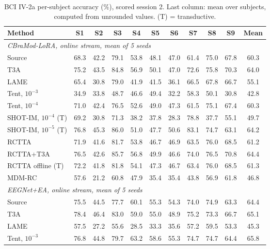 \documentclass[preprint,12pt]{elsarticle}
\begin{document}
\begin{table}[!htbp]
\centering
\caption{BCI IV-2a per-subject accuracy (\%), scored session 2. Last column: mean over subjects, computed from unrounded values. (T) = transductive.}
\label{tab:persub}
\setlength{\tabcolsep}{5pt}
\begin{adjustbox}{max width=\textwidth}
\begin{tabular}{@{}l ccccccccc c@{}}
\toprule
Method & S1 & S2 & S3 & S4 & S5 & S6 & S7 & S8 & S9 & Mean \\
\midrule
\multicolumn{11}{l}{\textit{CBraMod-LoRA, online stream, mean of 5 seeds}}\\
Source & 68.3 & 42.2 & 79.1 & 53.8 & 48.1 & 47.0 & 61.4 & 75.0 & 67.8 & 60.3 \\
T3A & 75.2 & 43.5 & 84.8 & 56.9 & 50.1 & 47.0 & 72.6 & 75.8 & 70.3 & 64.0 \\
LAME & 65.4 & 30.8 & 79.0 & 41.9 & 41.5 & 36.1 & 66.5 & 67.8 & 66.7 & 55.1 \\
Tent, $10^{-3}$ & 34.9 & 33.8 & 48.7 & 46.6 & 49.4 & 32.2 & 58.3 & 50.1 & 30.8 & 42.8 \\
Tent, $10^{-4}$ & 71.0 & 42.4 & 76.5 & 52.6 & 49.0 & 47.3 & 61.5 & 75.1 & 67.4 & 60.3 \\
SHOT-IM, $10^{-4}$ (T) & 69.2 & 30.8 & 71.3 & 38.2 & 37.8 & 28.3 & 78.8 & 37.7 & 55.1 & 49.7 \\
SHOT-IM, $10^{-5}$ (T) & 76.8 & 45.3 & 86.0 & 51.0 & 47.7 & 50.6 & 83.1 & 74.7 & 63.1 & 64.2 \\
RCTTA & 71.9 & 41.6 & 81.7 & 53.8 & 46.7 & 46.9 & 63.5 & 76.0 & 68.5 & 61.2 \\
RCTTA+T3A & 76.5 & 42.6 & 85.7 & 56.8 & 49.9 & 46.6 & 74.0 & 76.5 & 70.8 & 64.4 \\
RCTTA offline (T) & 72.2 & 41.8 & 81.8 & 54.1 & 47.3 & 46.7 & 63.4 & 76.0 & 68.5 & 61.3 \\
MDM-RC & 57.6 & 21.2 & 60.8 & 47.9 & 35.4 & 35.4 & 43.8 & 56.9 & 61.8 & 46.8 \\
\midrule
\multicolumn{11}{l}{\textit{EEGNet+EA, online stream, mean of 5 seeds}}\\
Source & 75.5 & 44.5 & 77.7 & 60.1 & 55.3 & 54.3 & 74.0 & 74.9 & 63.3 & 64.4 \\
T3A & 78.4 & 46.4 & 83.0 & 59.0 & 55.0 & 48.9 & 75.2 & 73.3 & 66.7 & 65.1 \\
LAME & 57.5 & 27.2 & 55.6 & 28.5 & 33.3 & 35.6 & 57.2 & 59.5 & 53.3 & 45.3 \\
Tent, $10^{-3}$ & 76.8 & 44.8 & 79.7 & 63.2 & 58.6 & 55.3 & 74.7 & 74.7 & 64.4 & 65.8 \\

\end{tabular}
\end{adjustbox}
\end{table}
\end{document}
